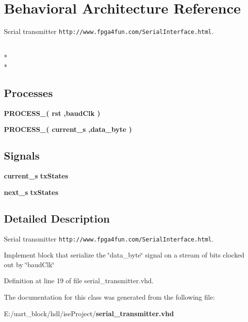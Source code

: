 \section{Behavioral Architecture Reference}
\label{classserial__transmitter_1_1_behavioral}


Serial transmitter {\tt http\-://www.\-fpga4fun.\-com/\-Serial\-Interface.\-html}.  


\\*
\\*
\subsection*{Processes}
 \begin{DoxyCompactItemize}
\item 
{\bf P\-R\-O\-C\-E\-S\-S\-\_}{\bfseries  ( {\bfseries {\bfseries {\bf rst}}   ,{\bfseries {\bf baud\-Clk}}  } )}\label{classserial__transmitter_1_1_behavioral_a82826f99e62c6a945ef0659e256a9a17}

\item 
{\bf P\-R\-O\-C\-E\-S\-S\-\_}{\bfseries  ( {\bfseries current\-\_\-s  ,{\bfseries {\bf data\-\_\-byte}}  } )}\label{classserial__transmitter_1_1_behavioral_ae9a73197cd4c2a8888d0bea4853b1ce5}

\end{DoxyCompactItemize}
\subsection*{Signals}
 \begin{DoxyCompactItemize}
\item 
{\bf current\-\_\-s} {\bfseries tx\-States } \label{classserial__transmitter_1_1_behavioral_ada42051d3e39368808b60c3fa4725b22}

\item 
{\bf next\-\_\-s} {\bfseries tx\-States } \label{classserial__transmitter_1_1_behavioral_a6a0ab6e3ac55ab764d07bb6705d598cc}

\end{DoxyCompactItemize}


\subsection{Detailed Description}
Serial transmitter {\tt http\-://www.\-fpga4fun.\-com/\-Serial\-Interface.\-html}. 

Implement block that serialize the \char`\"{}data\-\_\-byte\char`\"{} signal on a stream of bits clocked out by \char`\"{}baud\-Clk\char`\"{} 

Definition at line 19 of file serial\-\_\-transmitter.\-vhd.



The documentation for this class was generated from the following file\-:\begin{DoxyCompactItemize}
\item 
E\-:/uart\-\_\-block/hdl/ise\-Project/{\bf serial\-\_\-transmitter.\-vhd}\end{DoxyCompactItemize}
